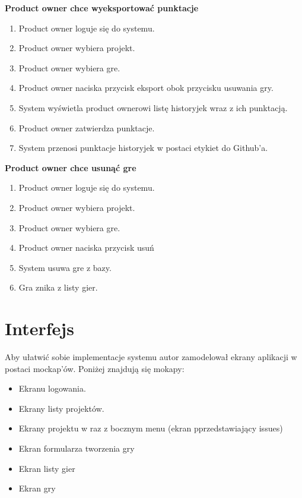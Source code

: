 \textbf{Product owner chce wyeksportować punktacje}

\begin{enumerate}
    \item Product owner loguje się do systemu.
    \item Product owner wybiera projekt.
    \item Product owner wybiera gre.
    \item Product owner naciska przycisk eksport obok przycisku usuwania gry.
    \item System wyświetla product ownerowi listę historyjek wraz z ich punktacją.
    \item Product owner zatwierdza punktacje.
    \item System przenosi punktacje historyjek w postaci etykiet do Github'a.
\end{enumerate}

\textbf{Product owner chce usunąć gre}

\begin{enumerate}
    \item Product owner loguje się do systemu.
    \item Product owner wybiera projekt.
    \item Product owner wybiera gre.
    \item Product owner naciska przycisk usuń
    \item System usuwa gre z bazy.
    \item Gra znika z listy gier.
\end{enumerate}

\section{Interfejs}

Aby ułatwić sobie implementacje systemu autor zamodelował ekrany aplikacji w postaci mockap'ów.
Poniżej znajdują się mokapy:

\begin{itemize}
    \item Ekranu logowania.
    \item Ekrany listy projektów.
    \item Ekrany projektu w raz z bocznym menu (ekran pprzedstawiający issues)
    \item Ekran formularza tworzenia gry
    \item Ekran listy gier
    \item Ekran gry
\end{itemize}

